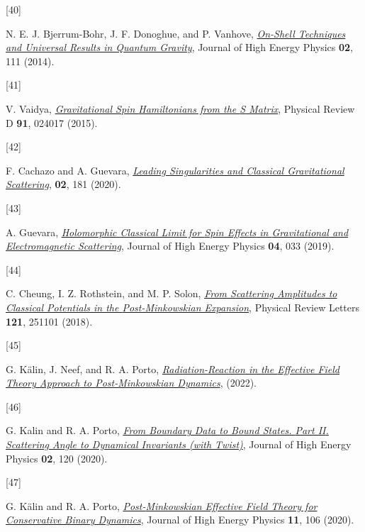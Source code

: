 \documentclass[
  11pt,
  a4paper,
  DIV=11,
  numbers=noendperiod,
  twoside]{scrreprt}
\newlength{\cslhangindent}
\newlength{\csllabelwidth}
\newlength{\cslentryspacingunit} %
\newenvironment{CSLReferences}[2] %
 {%
  \setlength{\parindent}{0pt}
  \ifodd #1
  \let\oldpar\par
  \def\par{\hangindent=\cslhangindent\oldpar}
  \fi
  \setlength{\parskip}{#2\cslentryspacingunit}
 }%
 {}
\newcommand{\CSLLeftMargin}[1]{\parbox[t]{\csllabelwidth}{#1}}
\newcommand{\CSLRightInline}[1]{\parbox[t]{\linewidth - \csllabelwidth}{#1}\break}
\DeclareRobustCommand{\[}{\begin{equation}}
\DeclareRobustCommand{\]}{\end{equation}}
\begin{document}
\begin{CSLReferences}{0}{0}
\leavevmode{}%
\CSLLeftMargin{{[}40{]} }%
\CSLRightInline{N. E. J. Bjerrum-Bohr, J. F. Donoghue, and P. Vanhove,
\emph{\href{https://doi.org/10.1007/JHEP02(2014)111}{On-Shell Techniques
and Universal Results in Quantum Gravity}}, Journal of High Energy
Physics \textbf{02}, 111 (2014).}

\leavevmode{}%
\CSLLeftMargin{{[}41{]} }%
\CSLRightInline{V. Vaidya,
\emph{\href{https://doi.org/10.1103/PhysRevD.91.024017}{Gravitational
Spin {Hamiltonians} from the {S} Matrix}}, Physical Review D
\textbf{91}, 024017 (2015).}

\leavevmode{}%
\CSLLeftMargin{{[}42{]} }%
\CSLRightInline{F. Cachazo and A. Guevara,
\emph{\href{https://doi.org/10.1007/JHEP02(2020)181}{Leading
{Singularities} and {Classical Gravitational Scattering}}}, \textbf{02},
181 (2020).}

\leavevmode{}%
\CSLLeftMargin{{[}43{]} }%
\CSLRightInline{A. Guevara,
\emph{\href{https://doi.org/10.1007/JHEP04(2019)033}{Holomorphic
{Classical Limit} for {Spin Effects} in {Gravitational} and
{Electromagnetic Scattering}}}, Journal of High Energy Physics
\textbf{04}, 033 (2019).}

\leavevmode{}%
\CSLLeftMargin{{[}44{]} }%
\CSLRightInline{C. Cheung, I. Z. Rothstein, and M. P. Solon,
\emph{\href{https://doi.org/10.1103/PhysRevLett.121.251101}{From
{Scattering Amplitudes} to {Classical Potentials} in the
{Post-Minkowskian Expansion}}}, Physical Review Letters \textbf{121},
251101 (2018).}

\leavevmode{}%
\CSLLeftMargin{{[}45{]} }%
\CSLRightInline{G. Kälin, J. Neef, and R. A. Porto,
\emph{\href{https://arxiv.org/abs/2207.00580}{Radiation-{Reaction} in
the {Effective Field Theory Approach} to {Post-Minkowskian Dynamics}}},
(2022).}

\leavevmode{}%
\CSLLeftMargin{{[}46{]} }%
\CSLRightInline{G. Kalin and R. A. Porto,
\emph{\href{https://doi.org/10.1007/JHEP02(2020)120}{From Boundary Data
to Bound States. {Part II}. {Scattering} Angle to Dynamical Invariants
(with Twist)}}, Journal of High Energy Physics \textbf{02}, 120 (2020).}

\leavevmode{}%
\CSLLeftMargin{{[}47{]} }%
\CSLRightInline{G. Kälin and R. A. Porto,
\emph{\href{https://doi.org/10.1007/JHEP11(2020)106}{Post-{Minkowskian
Effective Field Theory} for {Conservative Binary Dynamics}}}, Journal of
High Energy Physics \textbf{11}, 106 (2020).}


\end{CSLReferences}
\end{document}
